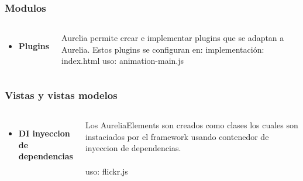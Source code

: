 \documentclass{beamer}
\begin{document}
\begin{frame}
\frametitle{Modulos}
\begin{columns}[c] %

\begin{itemize}
\item \textbf{Plugins}
\end{itemize}

Aurelia permite crear e implementar plugins que se adaptan a Aurelia.
Estos plugins se configuran en:
implementación: index.html
uso: animation-main.js
\end{columns}
\end{frame}




\begin{frame}
\frametitle{Vistas y vistas modelos}
\begin{columns}[c]

\begin{itemize}
\item \textbf{DI inyeccion de dependencias}
\end{itemize}

Los AureliaElements son creados como clases los cuales son instaciados por el framework usando contenedor de inyeccion de dependencias.
\\~\\
uso: flickr.js
\end{columns}
\end{frame}
\end{document}
